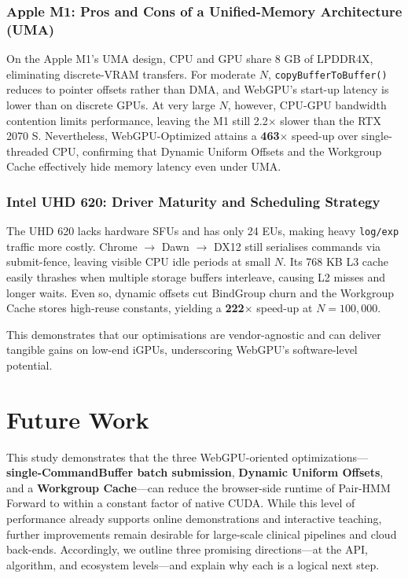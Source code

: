 \documentclass[PhD]{PHlab-thesis}
\begin{document}
\subsection{Apple M1: Pros and Cons of a Unified-Memory Architecture (UMA)}
On the Apple M1’s UMA design, CPU and GPU share 8 GB of LPDDR4X, eliminating discrete-VRAM transfers.
For moderate $N$, \texttt{copyBufferToBuffer()} reduces to pointer offsets rather than DMA, and WebGPU’s start-up latency is lower than on discrete GPUs.
At very large $N$, however, CPU-GPU bandwidth contention limits performance, leaving the M1 still 2.2$\times$ slower than the RTX 2070 S.
Nevertheless, WebGPU-Optimized attains a \textbf{463$\times$} speed-up over single-threaded CPU, confirming that Dynamic Uniform Offsets and the Workgroup Cache effectively hide memory latency even under UMA.

\subsection{Intel UHD 620: Driver Maturity and Scheduling Strategy}
The UHD 620 lacks hardware SFUs and has only 24 EUs, making heavy \texttt{log/exp} traffic more costly.
Chrome $\rightarrow$ Dawn $\rightarrow$ DX12 still serialises commands via submit-fence, leaving visible CPU idle periods at small $N$.
Its 768 KB L3 cache easily thrashes when multiple storage buffers interleave, causing L2 misses and longer waits.
Even so, dynamic offsets cut BindGroup churn and the Workgroup Cache stores high-reuse constants, yielding a \textbf{222$\times$} speed-up at $N = 100,000$.

This demonstrates that our optimisations are vendor-agnostic and can deliver tangible gains on low-end iGPUs, underscoring WebGPU’s software-level potential.



\chapter{Future Work}
This study demonstrates that the three WebGPU-oriented optimizations—\textbf{single-CommandBuffer batch submission}, \textbf{Dynamic Uniform Offsets}, and a \textbf{Workgroup Cache}—can reduce the browser-side runtime of Pair-HMM Forward to within a constant factor of native CUDA. While this level of performance already supports online demonstrations and interactive teaching, further improvements remain desirable for large-scale clinical pipelines and cloud back-ends. Accordingly, we outline three promising directions—at the API, algorithm, and ecosystem levels—and explain why each is a logical next step.
\end{document}
